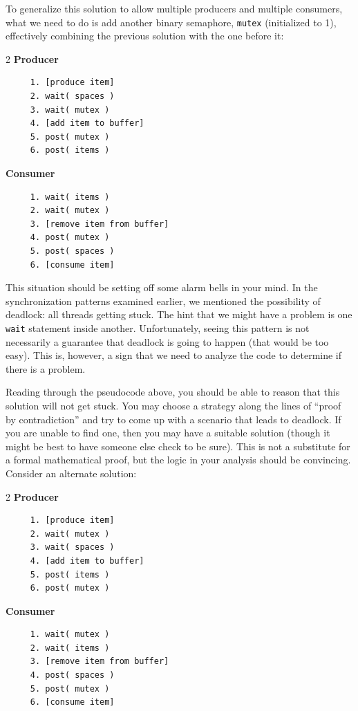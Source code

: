 To generalize this solution to allow multiple producers and multiple consumers, what we need to do is add another binary semaphore, \texttt{mutex} (initialized to 1), effectively combining the previous solution with the one before it:

\begin{multicols}{2}
	\textbf{Producer}\vspace{-2em}
	\begin{verbatim}
	 1. [produce item]
	 2. wait( spaces )
	 3. wait( mutex )
	 4. [add item to buffer]
	 5. post( mutex )
	 6. post( items )
  \end{verbatim}
	\columnbreak
	\textbf{Consumer}\vspace{-2em}
	\begin{verbatim}
	 1. wait( items )
	 2. wait( mutex )
	 3. [remove item from buffer]
	 4. post( mutex )
	 5. post( spaces )
	 6. [consume item]
  \end{verbatim}
\end{multicols}
\vspace{-2em}

This situation should be setting off some alarm bells in your mind. In the synchronization patterns examined earlier, we mentioned the possibility of deadlock: all threads getting stuck. The hint that we might have a problem is one \texttt{wait} statement inside another. Unfortunately, seeing this pattern is not necessarily a guarantee that deadlock is going to happen (that would be too easy). This is, however, a sign that we need to analyze the code to determine if there is a problem.

Reading through the pseudocode above, you should be able to reason that this solution will not get stuck. You may choose a strategy along the lines of ``proof by contradiction'' and try to come up with a scenario that leads to deadlock. If you are unable to find one, then you may have a suitable solution (though it might be best to have someone else check to be sure). This is not a substitute for a formal mathematical proof, but the logic in your analysis should be convincing. Consider an alternate solution:

\begin{multicols}{2}
	\textbf{Producer}\vspace{-2em}
	\begin{verbatim}
	 1. [produce item]
	 2. wait( mutex )
	 3. wait( spaces )
	 4. [add item to buffer]
	 5. post( items )
	 6. post( mutex )
  \end{verbatim}
	\columnbreak
	\textbf{Consumer}\vspace{-2em}
	\begin{verbatim}
	 1. wait( mutex )
	 2. wait( items )
	 3. [remove item from buffer]
	 4. post( spaces )
	 5. post( mutex )
	 6. [consume item]
  \end{verbatim}
\end{multicols}
\vspace{-2em}

